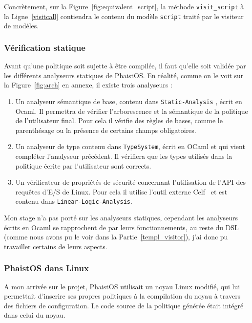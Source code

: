 Concrètement, sur la Figure~\ref{fig:equivalent_script}, la méthode \texttt
{visit\_script} à la Ligne~\ref{visitcall} contiendra le contenu du modèle 
\texttt{script} traité par le visiteur de modèles.

\subsubsection{Vérification statique}
\label{analyzers}

Avant qu'une politique soit sujette à être compilée, il faut qu'elle soit 
validée par les différents analyseurs statiques de PhaistOS. En réalité, comme 
on le voit sur la Figure~\ref{fig:arch} en annexe, il existe trois analyseurs : 

\begin{enumerate}
    \item Un analyseur sémantique de base, contenu dans \texttt{Static-Analysis}
    , écrit en Ocaml. Il permettra de vérifier l'arborescence et la sémantique 
    de la politique de l'utilisateur final. Pour cela il vérifie des règles de 
    bases, comme le parenthésage ou la présence de certains champs obligatoires.
    \item Un analyseur de type contenu dans \texttt{TypeSystem}, écrit en OCaml 
    et qui vient compléter l'analyseur précédent. Il vérifiera que les types 
    utilisés dans la politique écrite par l'utilisateur sont corrects.
    \item Un vérificateur de propriétés de sécurité concernant l'utilisation de 
    l'API des requêtes d'E/S de Linux. Pour cela il utilise l'outil externe 
    Celf~\cite{schack2008celf} et est contenu dans \texttt
    {Linear-Logic-Analysis}.
\end{enumerate}

Mon stage n'a pas porté sur les analyseurs statiques, cependant les analyseurs 
écrits en Ocaml se rapprochent de par leurs fonctionnements, au reste du DSL 
(comme nous avons pu le voir dans la Partie~\ref{templ_visitor}), j'ai donc pu 
travailler certains de leurs aspects.

\subsubsection{PhaistOS dans Linux}

A mon arrivée sur le projet, PhaistOS utilisait un noyau Linux modifié, qui lui 
permettait d'inscrire ses propres politiques à la compilation du noyau à 
travers des fichiers de configuration. Le code source de la politique générée 
était intégré dans celui du noyau.

